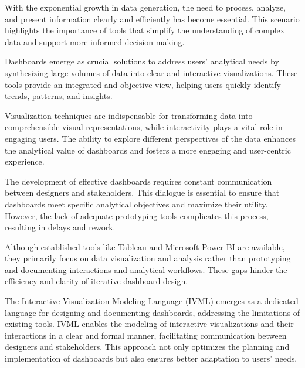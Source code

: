 
%

With the exponential growth in data generation, the need to process, analyze, and present information clearly and efficiently has become essential. This scenario highlights the importance of tools that simplify the understanding of complex data and support more informed decision-making.

Dashboards emerge as crucial solutions to address users' analytical needs by synthesizing large volumes of data into clear and interactive visualizations. These tools provide an integrated and objective view, helping users quickly identify trends, patterns, and insights.

Visualization techniques are indispensable for transforming data into comprehensible visual representations, while interactivity plays a vital role in engaging users. The ability to explore different perspectives of the data enhances the analytical value of dashboards and fosters a more engaging and user-centric experience.

The development of effective dashboards requires constant communication between designers and stakeholders. This dialogue is essential to ensure that dashboards meet specific analytical objectives and maximize their utility. However, the lack of adequate prototyping tools complicates this process, resulting in delays and rework.

Although established tools like Tableau and Microsoft Power BI are available, they primarily focus on data visualization and analysis rather than prototyping and documenting interactions and analytical workflows. These gaps hinder the efficiency and clarity of iterative dashboard design.

The Interactive Visualization Modeling Language (IVML) emerges as a dedicated language for designing and documenting dashboards, addressing the limitations of existing tools. IVML enables the modeling of interactive visualizations and their interactions in a clear and formal manner, facilitating communication between designers and stakeholders. This approach not only optimizes the planning and implementation of dashboards but also ensures better adaptation to users' needs.


